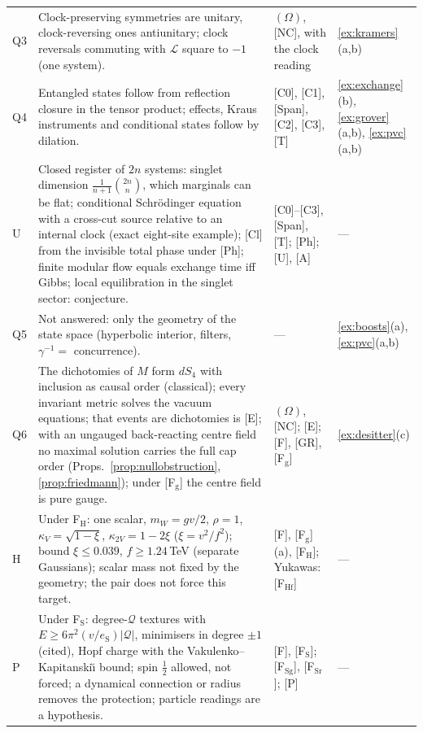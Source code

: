 \documentclass[aps,pra,onecolumn,superscriptaddress,nofootinbib,10pt]{revtex4-2}
\theoremstyle{definition}
\theoremstyle{remark}
\newcommand{\cL}{\mathcal{L}}
\begin{document}
\begin{table}[h]
\begin{tabular}{@{}p{}p{}p{}p{}@{}}
Q3 & Clock-preserving symmetries are unitary, clock-reversing ones antiunitary; clock reversals commuting with $\cL$ square to $-1$ (one system). & $(\Omega)$, [NC], with the clock reading & \ref{ex:kramers}(a,b)\\
Q4 & Entangled states follow from reflection closure in the tensor product; effects, Kraus instruments and conditional states follow by dilation. & [C0], [C1], [Span], [C2], [C3], [T] & \ref{ex:exchange}(b), \ref{ex:grover}(a,b), \ref{ex:pvc}(a,b)\\
U & Closed register of $2n$ systems: singlet dimension $\frac1{n+1}\binom{2n}{n}$, which marginals can be flat; conditional Schr\"odinger equation with a cross-cut source relative to an internal clock (exact eight-site example); [Cl] from the invisible total phase under [Ph]; finite modular flow equals exchange time iff Gibbs; local equilibration in the singlet sector: conjecture. & [C0]--[C3], [Span], [T]; [Ph]; [U], [A] & ---\\
Q5 & Not answered: only the geometry of the state space (hyperbolic interior, filters, $\gamma^{-1}=$ concurrence). & --- & \ref{ex:boosts}(a), \ref{ex:pvc}(a,b)\\
Q6 & The dichotomies of $M$ form $dS_4$ with inclusion as causal order (classical); every invariant metric solves the vacuum equations; that events are dichotomies is [E]; with an ungauged back-reacting centre field no maximal solution carries the full cap order (Props.~\ref{prop:nullobstruction}, \ref{prop:friedmann}); under [F$_{\mathrm g}$] the centre field is pure gauge. & $(\Omega)$, [NC]; [E]; [F], [GR], [F$_{\mathrm g}$] & \ref{ex:desitter}(c)\\
H & Under F$_{\mathrm H}$: one scalar, $m_W=gv/2$, $\rho=1$, $\kappa_V=\sqrt{1-\xi}$, $\kappa_{2V}=1-2\xi$ ($\xi=v^2/f^2$); bound $\xi\le0.039$, $f\ge1.24$\,TeV (separate Gaussians); scalar mass not fixed by the geometry; the pair does not force this target. & [F], [F$_{\mathrm g}$](a), [F$_{\mathrm H}$]; Yukawas: [F$_{\mathrm{Hf}}$] & ---\\
P & Under F$_{\mathrm S}$: degree-$\mathcal Q$ textures with $E\ge6\pi^2(v/e_{\mathrm S})\lvert\mathcal Q\rvert$, minimisers in degree $\pm1$ (cited), Hopf charge with the Vakulenko--Kapitanski\u{\i} bound; spin $\tfrac12$ allowed, not forced; a dynamical connection or radius removes the protection; particle readings are a hypothesis. & [F], [F$_{\mathrm S}$]; [F$_{\mathrm{Sg}}$], [F$_{\mathrm{Sr}}$]; [P] & ---\\

\end{tabular}
\end{table}
\end{document}
